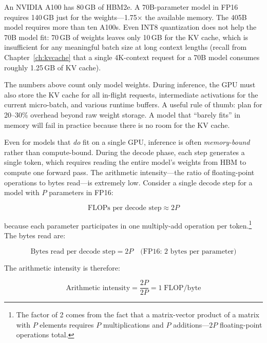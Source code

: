 An NVIDIA A100 has 80\,GB of HBM2e. A 70B-parameter model in FP16 requires 140\,GB just for the weights---1.75$\times$ the available memory. The 405B model requires more than ten A100s. Even INT8 quantization does not help the 70B model fit: 70\,GB of weights leaves only 10\,GB for the KV cache, which is insufficient for any meaningful batch size at long context lengths (recall from Chapter~\ref{ch:kvcache} that a single 4K-context request for a 70B model consumes roughly 1.25\,GB of KV cache).

\begin{notebox}
The numbers above count only model weights. During inference, the GPU must also store the KV cache for all in-flight requests, intermediate activations for the current micro-batch, and various runtime buffers. A useful rule of thumb: plan for 20--30\% overhead beyond raw weight storage. A model that ``barely fits'' in memory will fail in practice because there is no room for the KV cache.
\end{notebox}

Even for models that \emph{do} fit on a single GPU, inference is often \emph{memory-bound} rather than compute-bound. During the decode phase, each step generates a single token, which requires reading the entire model's weights from HBM to compute one forward pass. The arithmetic intensity---the ratio of floating-point operations to bytes read---is extremely low. Consider a single decode step for a model with $P$ parameters in FP16:

\begin{equation}
\label{eq:decode-flops}
\text{FLOPs per decode step} \approx 2P
\end{equation}

\noindent because each parameter participates in one multiply-add operation per token.\footnote{The factor of 2 comes from the fact that a matrix-vector product of a matrix with $P$ elements requires $P$ multiplications and $P$ additions---$2P$ floating-point operations total.} The bytes read are:

\begin{equation}
\label{eq:decode-bytes}
\text{Bytes read per decode step} = 2P \quad \text{(FP16: 2 bytes per parameter)}
\end{equation}

\noindent The arithmetic intensity is therefore:

\begin{equation}
\label{eq:arith-intensity}
\text{Arithmetic intensity} = \frac{2P}{2P} = 1 \;\text{FLOP/byte}
\end{equation}

